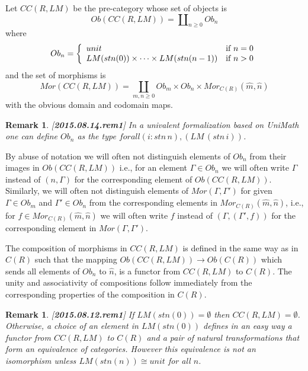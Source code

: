 \documentclass[11pt]{article}
\newtheorem{remark}[proposition]{Remark}
\newcommand{\llabel}[1]{\label{#1}[{\bf #1}]}
\newcommand{\sr}{\rightarrow}
\newcommand{\wh}{\widehat}
\begin{document}
Let $CC(R,LM)$ be the pre-category whose set of objects is 
%
$$Ob(CC(R,LM))=\amalg_{n\ge 0} Ob_n$$
%
where 
%
$$Ob_n=\left\{
\begin{array}{ll}
unit&\mbox{\rm if $n=0$}\\
LM(stn(0))\times\dots\times LM(stn(n-1))&\mbox{\rm if $n>0$}
\end{array}
\right.
$$
%
and the set of morphisms is
%
$$Mor(CC(R,LM))=\coprod_{m,n\ge 0} Ob_m\times Ob_n\times Mor_{C(R)}(\wh{m},\wh{n})$$
%
with the obvious domain and codomain maps. 
%
\begin{remark}\rm
\llabel{2015.08.14.rem1}
In a univalent formalization based on UniMath one can define $Ob_n$ as the type $forall(i:stn\,n),(LM\, (stn\,i))$. 
\end{remark}
%

By abuse of notation we will often not distinguish elements of $Ob_n$ from their images in $Ob(CC(R,LM))$ i.e., for an element $\Gamma\in Ob_n$ we will often write $\Gamma$ instead of $(n,\Gamma)$ for the corresponding element of $Ob(CC(R,LM))$. Similarly, we will often not distinguish elements of $Mor(\Gamma,\Gamma')$ for given $\Gamma\in Ob_m$ and $\Gamma'\in Ob_n$ from the corresponding elements in $Mor_{C(R)}(\wh{m},\wh{n})$, i.e., for $f\in Mor_{C(R)}(\wh{m},\wh{n})$ we will often write $f$ instead of $(\Gamma,(\Gamma',f))$ for the corresponding element in $Mor(\Gamma,\Gamma')$.


The composition of morphisms in $CC(R,LM)$ is defined in the same way as in $C(R)$ such that the mapping $Ob(CC(R,LM))\sr Ob(C(R))$ which sends all elements of $Ob_n$ to $\wh{n}$, is a functor from $CC(R,LM)$ to $C(R)$. The unity and associativity of compositions follow immediately from the corresponding properties of the composition in $C(R)$. 

\begin{remark}\rm
\llabel{2015.08.12.rem1}
If $LM({stn(0)})=\emptyset$ then $CC(R,LM)=\emptyset$. Otherwise, a choice of an element in $LM({stn(0)})$ defines in an easy way a functor from $CC(R,LM)$ to $C(R)$ and a pair of natural transformations that form an equivalence of categories. However this equivalence is not an isomorphism unless $LM(stn(n))\cong unit$ for all $n$. 
\end{remark}
%
\end{document}
